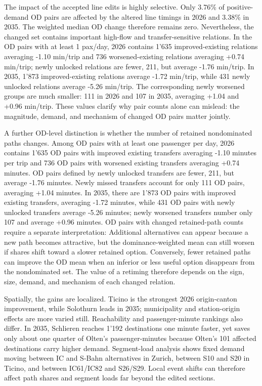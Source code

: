 \documentclass[conference]{IEEEtran}
\begin{document}
The impact of the accepted line edits is highly selective. Only 3.76\% of positive-demand OD pairs are affected by the altered line timings in 2026 and 3.38\% in 2035. The weighted median OD change therefore remains zero. Nevertheless, the changed set contains important high-flow and transfer-sensitive relations. In the OD pairs with at least 1 pax/day, 2026 contains 1'635 improved-existing relations averaging -1.10 min/trip and 736 worsened-existing relations averaging +0.74 min/trip; newly unlocked relations are fewer, 211, but average -1.76 min/trip. In 2035, 1'873 improved-existing relations average -1.72 min/trip, while 431 newly unlocked relations average -5.26 min/trip. The corresponding newly worsened groups are much smaller: 111 in 2026 and 107 in 2035, averaging +1.04 and +0.96 min/trip. These values clarify why pair counts alone can mislead: the magnitude, demand, and mechanism of changed OD pairs matter jointly.

A further OD-level distinction is whether the number of retained nondominated paths changes. Among OD pairs with at least one passenger per day, 2026 contains 1'635 OD pairs with improved existing transfers averaging -1.10 minutes per trip and 736 OD pairs with worsened existing transfers averaging +0.74 minutes. OD pairs defined by newly unlocked transfers are fewer, 211, but average -1.76 minutes. Newly missed transfers account for only 111 OD pairs, averaging +1.04 minutes. In 2035, there are 1'873 OD pairs with improved existing transfers, averaging -1.72 minutes, while 431 OD pairs with newly unlocked transfers average -5.26 minutes; newly worsened transfers number only 107 and average +0.96 minutes. OD pairs with changed retained-path counts require a separate interpretation: Additional alternatives can appear because a new path becomes attractive, but the dominance-weighted mean can still worsen if shares shift toward a slower retained option. Conversely, fewer retained paths can improve the OD mean when an inferior or less useful option disappears from the nondominated set. The value of a retiming therefore depends on the sign, size, demand, and mechanism of each changed relation.

Spatially, the gains are localized. Ticino is the strongest 2026 origin-canton improvement, while Solothurn leads in 2035; municipality and station-origin effects are more varied still. Reachability and passenger-minute rankings also differ. In 2035, Schlieren reaches 1'192 destinations one minute faster, yet saves only about one quarter of Olten's passenger-minutes because Olten's 101 affected destinations carry higher demand. Segment-load analysis shows fixed demand moving between IC and S-Bahn alternatives in Zurich, between S10 and S20 in Ticino, and between IC61/IC82 and S26/S29. Local event shifts can therefore affect path shares and segment loads far beyond the edited sections.
\end{document}
